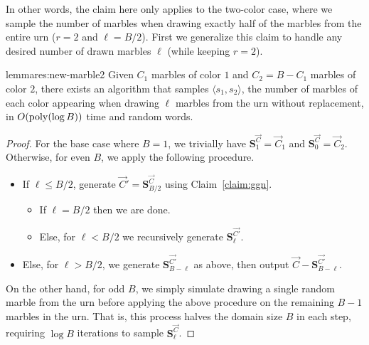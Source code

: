 In other words, the claim here only applies to the two-color case,
where we sample the number of marbles when drawing exactly half of the marbles from the entire urn ($r=2$ and $\ell = B/2$).
First we generalize this claim to handle any desired number of drawn marbles $\ell$ (while keeping $r=2$).

\begin{restatable}{lemma}{res:new-marble2}\label{thm:sampling_two_colors}
Given $C_1$ marbles of color $1$ and $C_2 = B-C_1$ marbles of color $2$,
there exists an algorithm that samples $\langle s_1, s_2 \rangle$,
the number of marbles of each color appearing when drawing $\ell$ marbles from the urn without replacement,
in $O(\mathrm{poly}(\log B))$ time and random words.
\end{restatable}
\begin{proof}
For the base case where $B=1$, we trivially have $\mathbf{S}^\vec{C}_1=\vec{C}_1$ and $\mathbf{S}^\vec{C}_0=\vec{C}_2$.
Otherwise, for even $B$, we apply the following procedure.
\begin{itemize}
\item If $\ell \leq B/2$, generate $\vec{C}'=\mathbf{S}^\vec{C}_{B/2}$ using Claim~\ref{claim:ggn}.
\begin{itemize}
\item If $\ell = B/2$ then we are done.
\item Else, for $\ell < B/2$ we recursively generate $\mathbf{S}^\vec{C'}_{\ell}$.
\end{itemize}
\item Else, for $\ell > B/2$, we generate $\mathbf{S}^\vec{C'}_{B-\ell}$ as above, then output $\vec{C}-\mathbf{S}^\vec{C'}_{B-\ell}$.
\end{itemize}
On the other hand, for odd $B$, we simply simulate drawing a single random marble
from the urn before applying the above procedure on the remaining $B-1$ marbles in the urn.
That is, this process halves the domain size $B$ in each step, requiring $\log B$ iterations to sample $\mathbf{S}^\vec{C}_\ell$.
\end{proof}

